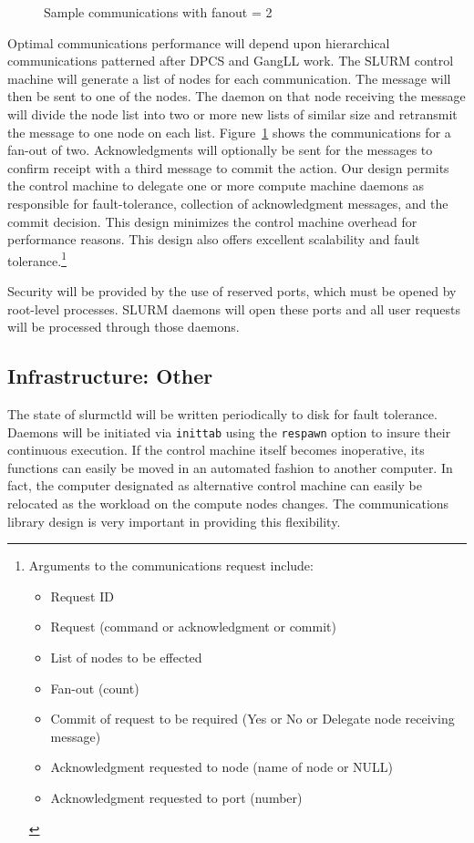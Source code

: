 \begin{figure}[htb]
\centerline{}
\caption{Sample communications with fanout = 2}
\label{communicate}
\end{figure}
Optimal communications performance will depend upon hierarchical communications
patterned after DPCS and GangLL work. The SLURM control machine will generate a
list of nodes for each communication. The message will then be sent to one of
the nodes. 
The daemon on that node receiving the message will divide the node list into
two or more new lists of similar size and retransmit the message to one node on
each list. Figure~\ref{communicate} shows the communications for a fan-out of 
two.  Acknowledgments will optionally be sent for the messages to confirm 
receipt with a third message to commit the action. Our design permits the 
control machine to delegate one or more compute machine daemons as responsible 
for fault-tolerance, collection of acknowledgment messages, and the commit
decision. This design minimizes the control machine overhead for performance
reasons. This design also offers excellent scalability and fault 
tolerance.\footnote{Arguments to the communications request include:
\begin{itemize}
\item Request ID
\item Request (command or acknowledgment or commit)
\item List of nodes to be effected
\item Fan-out (count)
\item Commit of request to be required (Yes or No or Delegate node receiving
      message) 
\item Acknowledgment requested to node (name of node or NULL)
\item Acknowledgment requested to port (number)
\end{itemize} }

Security will be provided by the use of reserved ports, which must be opened by
root-level processes. SLURM daemons will open these ports and all user requests
will be processed through those daemons. 

\subsection{Infrastructure: Other}

The state of slurmctld will be written periodically to disk for
fault tolerance. Daemons will be initiated via {\tt inittab} using 
the {\tt respawn} option to insure their continuous execution. 
If the control machine itself becomes inoperative, its functions can
easily be moved in an automated fashion to another computer. In fact, the
computer designated as alternative control machine can easily be relocated as
the workload on the compute nodes changes. The communications library design is
very important in providing this flexibility.

